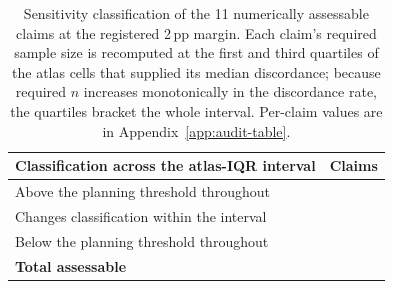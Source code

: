 \begin{table}[!t]
\centering
\caption{Sensitivity classification of the 11 numerically assessable claims at
the registered 2\,pp margin. Each claim's required sample size is recomputed at
the first and third quartiles of the atlas cells that supplied its median
discordance; because required $n$ increases monotonically in the discordance
rate, the quartiles bracket the whole interval. Per-claim values are in
Appendix~\ref{app:audit-table}.}
\label{tab:audit-sensitivity}
\begin{tabular}{lr}
\toprule
Classification across the atlas-IQR interval & Claims \\
\midrule
Above the planning threshold throughout          & \AuditAboveThroughout{} \\
Changes classification within the interval       & \AuditChangesWithinIQR{} \\
Below the planning threshold throughout          & \AuditBelowThroughout{} \\
\midrule
\textbf{Total assessable}                        & \textbf{\AuditAssessable{}} \\
\bottomrule
\end{tabular}
\end{table}

